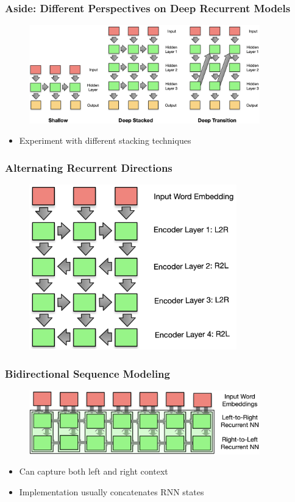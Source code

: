 \documentclass[usenames,dvipsnames]{beamer}
\begin{document}
\begin{frame}
\frametitle{Aside: Different Perspectives on Deep Recurrent Models}
\begin{figure}
  \centering
  \includegraphics[width=10cm]{assets/deep_models}
\end{figure}
\begin{itemize}
  \item Experiment with different stacking techniques
\end{itemize}
\end{frame}

\begin{frame}
\frametitle{Alternating Recurrent Directions}
\begin{figure}
  \centering
  \includegraphics[width=9cm]{assets/alternate_stacked}
\end{figure}
\end{frame}

\begin{frame}
\frametitle{Bidirectional Sequence Modeling}
\begin{figure}
  \centering
  \includegraphics[width=10cm]{assets/bidirectional}
\end{figure}
\begin{itemize}
  \item Can capture both left and right context
  \item Implementation usually concatenates RNN states
\end{itemize}
\end{frame}
\end{document}
